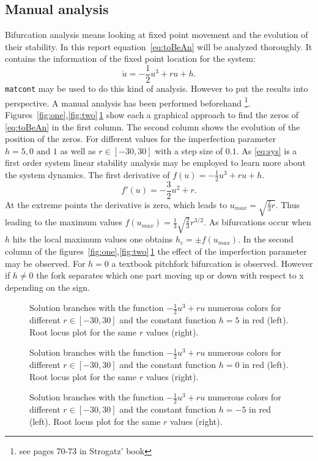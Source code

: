 \subsection{Manual analysis}
Bifurcation analysis means looking at fixed point movement and the evolution of their stability. In this report equation~\ref{eq:toBeAn} will be analyzed thoroughly. It contains the information of the fixed point location for the system:
\begin{equation}
\dot{u} = -\frac{1}{2} u^3 + ru + h. 
\label{eq:sys} 
\end{equation}
\texttt{matcont} may be used to do this kind of analysis. However to put the results into perspective. A manual analysis has been performed beforehand \footnote{see pages 70-73 in Strogatz' book}. Figures~\ref{fig:one},\ref{fig:two}\,\ref{fig:tree} show each a graphical approach to find the zeros of \ref{eq:toBeAn} in the first column. The second column shows the evolution of the position of the zeros. For different values for the imperfection parameter $h = 5,0 \text{ and } 1$ as well as $r \in [-30,30]$ with a step size of $0.1$.
As \ref{eq:sys} is a first order system linear stability analysis may be employed to learn more about the system dynamics. The first derivative of $f(u) = -\frac{1}{2} u^3 + ru + h$. 
\begin{equation}
f'(u) = -\frac{3}{2}u^2 + r.
\end{equation}
At the extreme points the derivative is zero, which leads to $u_{max} = \sqrt{\frac{2}{3}r}$. Thus leading to the maximum values $f(u_{max})= \frac{1}{3} \sqrt{\frac{2}{3}}r^{3/2}$. As bifurcations occur when $h$ hits the local maximum values one obtains $h_c = \pm f(u_{max})$. In the second column of the figures~\ref{fig:one},\ref{fig:two}\,\ref{fig:tree} the effect of the imperfection parameter may be observed. For $h = 0$ a textbook pitchfork bifurcation is observed. However if $h \ne 0$ the fork separates which one part moving up or down with respect to x depending on the sign.
\begin{figure}
\centering



\caption{Solution branches with the function $-\frac{1}{2} u^3 + ru $ numerous colors for different $r\in [-30,30]$ and the constant function $h=5$ in red (left). Root locus plot for the same $r$ values (right).}
\label{fig:one}



\caption{Solution branches with the function $-\frac{1}{2} u^3 + ru $ numerous colors for different $r\in [-30,30]$ and the constant function $h=0$ in red (left). Root locus plot for the same $r$ values (right).}
\label{fig:two}



\caption{Solution branches with the function $-\frac{1}{2} u^3 + ru $ numerous colors for different $r\in [-30,30]$ and the constant function $h=-5$ in red (left). Root locus plot for the same $r$ values (right).}
\label{fig:tree}
\end{figure}

